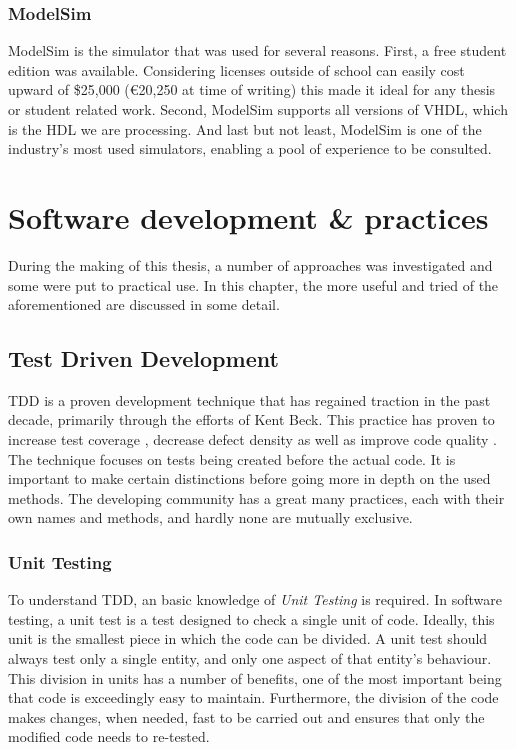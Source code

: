 \documentclass[11pt,british]{article}
\begin{document}
\subsubsection{ModelSim}
ModelSim is the simulator that was used for several reasons. First, a free student edition was available. Considering licenses  outside of school can easily cost upward of \$25,000 (\euro20,250 at time of writing) this made it ideal for any thesis or student related work. Second, ModelSim supports all versions of \gls{VHDL}, which is the \gls{HDL} we are processing. And last but not least, ModelSim is one of the industry's most used simulators, enabling a pool of experience to be consulted.

\newpage


\section{Software development \& practices}
During the making of this thesis, a number of approaches was investigated and some were put to practical use. In this chapter, the more useful and tried of the aforementioned are discussed in some detail.


\subsection{Test Driven Development}
\gls{TDD} is a proven development technique that has regained traction in the past decade, primarily through the efforts of Kent Beck\cite{VHDLUnit}. This practice has proven to increase test coverage \cite{Siniaalto:2007:CCS:1302496.1302946}, decrease defect density \cite{TDDinpractice} as well as improve code quality \cite{TDDinpractice,conf/isese/BhatN06}. The technique focuses on tests being created before the actual code. It is important to make certain distinctions before going more in depth on the used methods. The developing community has a great many practices, each with their own names and methods, and hardly none are mutually exclusive.

\subsubsection{Unit Testing}
To understand \gls{TDD}, an basic knowledge of \emph{Unit Testing} is required. In software testing, a unit test is a test designed to check a single unit of code. Ideally, this unit is the smallest piece in which the code can be divided. A unit test should always test only a single entity, and only one aspect of that entity's behaviour. This division in units has a number of benefits, one of the most important being that code is exceedingly easy to maintain. Furthermore, the division of the code makes changes, when needed, fast to be carried out and ensures that only the modified code needs to re-tested.
\end{document}
